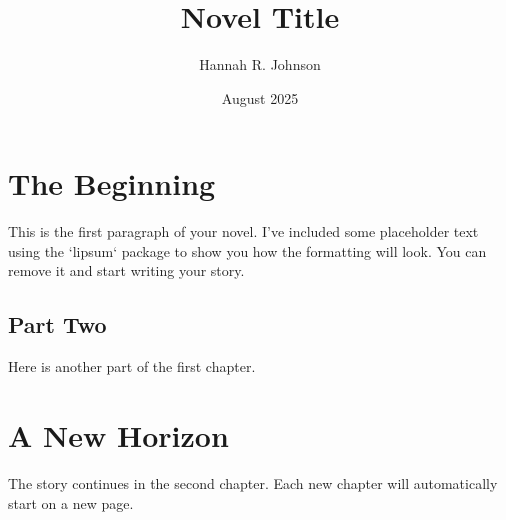 \documentclass[12pt, letterpaper]{book}
\title{Novel Title}
\author{Hannah R. Johnson}
\date{August 2025} %
\begin{document}
\frontmatter

\maketitle




\mainmatter

\chapter{The Beginning}
\label{chap:the-beginning}

This is the first paragraph of your novel. I've included some placeholder text using the `lipsum` package to show you how the formatting will look. You can remove it and start writing your story.

\lipsum[1-4] %

\section*{Part Two} %

Here is another part of the first chapter.

\lipsum[5-8] %

\chapter{A New Horizon}
\label{chap:new-horizon}

The story continues in the second chapter. Each new chapter will automatically start on a new page.

\lipsum[9-15] %


\end{document}
